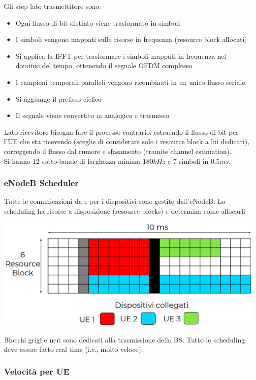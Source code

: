 Gli step lato trasmettitore sono: 
\begin{itemize}
	\item Ogni flusso di bit distinto viene trasformato in simboli
	\item I simboli vengono mappati sulle risorse in frequenza (resource block allocati)
	\item Si applica la IFFT per trasformare i simboli mappati in frequenza nel dominio del tempo, ottenendo il segnale OFDM complesso
	\item I campioni temporali paralleli vengono ricombinati in un unico flusso seriale
	\item Si aggiunge il prefisso ciclico
	\item Il segnale viene convertito in analogico e trasmesso
\end{itemize}
Lato ricevitore bisogna fare il processo contrario, estraendo il flusso di bit per l'UE che sta ricevendo (sceglie di considerare solo i resource block a lui dedicati), correggendo il flusso dal rumore e sfasamento (tramite channel estimation).\\

Si hanno 12 sotto-bande di larghezza minima $180 kHz$ e 7 simboli in $0.5ms$. \\

\subsubsection{eNodeB Scheduler}
Tutte le comunicazioni da e per i dispositivi sono gestite dall'eNodeB. Lo scheduling ha risorse a disposizione (resource blocks) e determina come allocarli
\begin{center}
	\includegraphics[width=0.75\linewidth]{img/mobile/alloc}
\end{center}
Blocchi grigi e neri sono dedicati alla trasmissione della BS. Tutto lo scheduling deve essere fatto real time (i.e., molto veloce).\\

\subsubsection{Velocità per UE}

